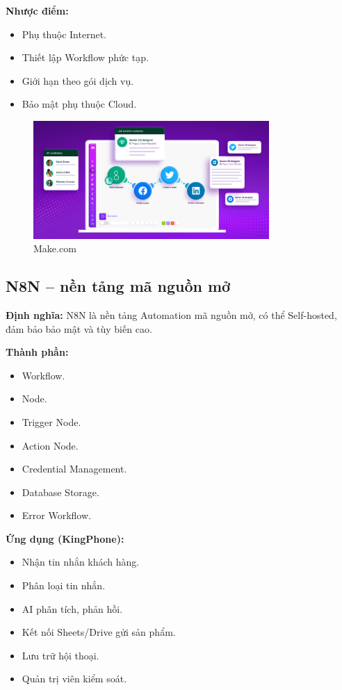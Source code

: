 \textbf{Nhược điểm:}
\begin{itemize}
    \item Phụ thuộc Internet.
    \item Thiết lập Workflow phức tạp.
    \item Giới hạn theo gói dịch vụ.
    \item Bảo mật phụ thuộc Cloud.
\end{itemize}

\begin{figure}
\centering
    \includegraphics[width=0.8\textwidth]{img/Picture4.png}

    \caption{Make.com}
    \label{fig:make}
\end{figure}


\subsection{N8N – nền tảng mã nguồn mở}

\textbf{Định nghĩa:} N8N là nền tảng Automation mã nguồn mở, có thể Self-hosted, đảm bảo bảo mật và tùy biến cao.

\textbf{Thành phần:}
\begin{itemize}
    \item Workflow.
    \item Node.
    \item Trigger Node.
    \item Action Node.
    \item Credential Management.
    \item Database Storage.
    \item Error Workflow.
\end{itemize}

\textbf{Ứng dụng (KingPhone):}
\begin{itemize}
    \item Nhận tin nhắn khách hàng.
    \item Phân loại tin nhắn.
    \item AI phân tích, phản hồi.
    \item Kết nối Sheets/Drive gửi sản phẩm.
    \item Lưu trữ hội thoại.
    \item Quản trị viên kiểm soát.
\end{itemize}

